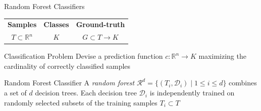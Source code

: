 \documentclass[t]{sdqbeamer}
\begin{document}
\begin{frame}{Random Forest Classifiers}

\begin{tabular}{ccc}
	\bf Samples & \bf Classes & \bf Ground-truth\\[.5em]
	$T \subset \mathbb{R}^n$ & $K$ & $G \subset T \rightarrow K$\\
\end{tabular}

\begin{block}{Classification Problem}
Devise a prediction function $c : \mathbb{R}^n \rightarrow K$ maximizing the cardinality of correctly classified samples
\end{block}

\begin{alertblock}{Random Forest Classifier}
A \emph{random forest} $\mathcal{R}^d = \{ (T_i, \mathcal{D}_i) \mid 1 \leq i \leq d \}$ combines a set of $d$ decision trees. 
Each decision tree $\mathcal{D}_i$ is independently trained on randomly selected subsets of the training samples $T_i \subset T$
\end{alertblock}
\end{frame}
\end{document}
